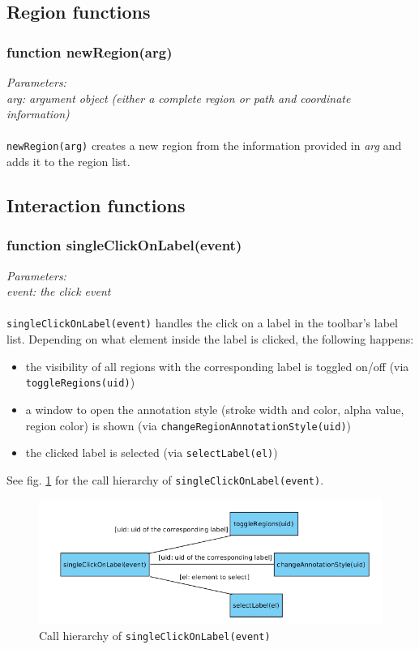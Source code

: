 \subsection{Region functions}
\subsubsection{function newRegion(arg)}
\emph{Parameters:\\
	arg: argument object (either a complete region or path and coordinate information)\\ \\
}
\texttt{newRegion(arg)} creates a new region from the information provided in \emph{arg} and adds it to the region list.


\subsection{Interaction functions}
\subsubsection{function singleClickOnLabel(event)}
\emph{Parameters:\\
	event: the click event\\ \\
}
\texttt{singleClickOnLabel(event)} handles the click on a label in the toolbar's label list. Depending on what element inside the label is clicked, the following happens:
\begin{itemize}
	\item the visibility of all regions with the corresponding label is toggled on/off (via \texttt{toggleRegions(uid)})
	\item a window to open the annotation style (stroke width and color, alpha value, region color) is shown (via \texttt{changeRegionAnnotationStyle(uid)})
	\item the clicked label is selected (via \texttt{selectLabel(el)})
\end{itemize}

See fig. \ref{figB_singleClickLabel} for the call hierarchy of \texttt{singleClickOnLabel(event)}.

\begin{figure}[H]
	\begin{center}
		\includegraphics[scale=0.5]{img/ch_singleClickLabel.png}
		\caption{Call hierarchy of \texttt{singleClickOnLabel(event)}}
		\label{figB_singleClickLabel}
	\end{center}
\end{figure}


